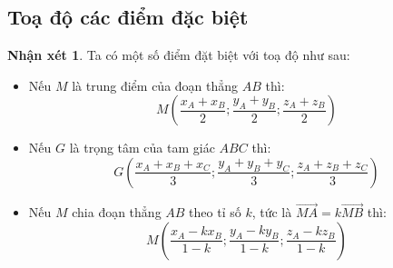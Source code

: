 \documentclass[12pt,a4paper,oneside]{book}
\theoremstyle{theorem}
\theoremstyle{definition}
\newtheorem{nx}[theorem2]{Nhận xét}
\begin{document}
    \subsection{Toạ độ các điểm đặc biệt}
    \begin{nx}
    Ta có một số điểm đặt biệt với toạ độ như sau:
        \begin{itemize}
            \item Nếu $M$ là trung điểm của đoạn thẳng $AB$ thì: 
            $$M\displaystyle \left(\frac{x_A+x_B}{2};\frac{y_A+y_B}{2};\frac{z_A+z_B}{2}\right)$$
            \item Nếu $G$ là trọng tâm của tam giác $ABC$ thì: 
            $$G\displaystyle \left(\frac{x_A+x_B+x_C}{3};\frac{y_A+y_B+y_C}{3};\frac{z_A+z_B+z_C}{3}\right)$$
            \item Nếu $M$ chia đoạn thẳng $AB$ theo tỉ số $k$, tức là 
            $\overrightarrow{MA}=k\overrightarrow{MB}$ thì: 
            $$M \displaystyle \left( \frac{x_A-kx_B}{1-k};\frac{y_A-ky_B}{1-k};\frac{z_A-kz_B}{1-k} \right)$$
        \end{itemize}
    \end{nx}
\end{document}

